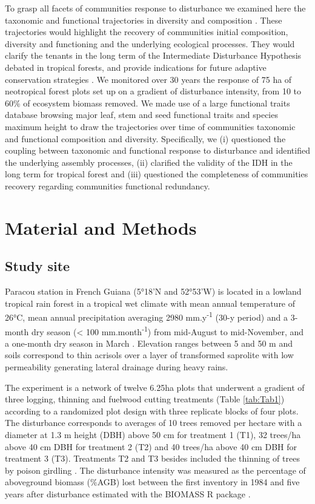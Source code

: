 \documentclass[fleqn,10pt]{ArtEcoFoG} %
\theoremstyle{definition}
\theoremstyle{definition}
\theoremstyle{definition}
\theoremstyle{remark}
\begin{document}
To grasp all facets of communities response to disturbance we examined
here the taxonomic and functional trajectories in diversity and
composition \citep{Lohbeck2015, Guariguata2001}. These trajectories
would highlight the recovery of communities initial composition,
diversity and functioning and the underlying ecological processes. They
would clarify the tenants in the long term of the Intermediate
Disturbance Hypothesis debated in tropical forests, and provide
indications for future adaptive conservation strategies
\citep{Adler2007}. We monitored over 30 years the response of 75 ha of
neotropical forest plots set up on a gradient of disturbance intensity,
from 10 to 60\% of ecosystem biomass removed. We made use of a large
functional traits database browsing major leaf, stem and seed functional
traits and species maximum height to draw the trajectories over time of
communities taxonomic and functional composition and diversity.
Specifically, we (i) questioned the coupling between taxonomic and
functional response to disturbance and identified the underlying
assembly processes, (ii) clarified the validity of the IDH in the long
term for tropical forest and (iii) questioned the completeness of
communities recovery regarding communities functional redundancy.

\section{Material and Methods}\label{material-and-methods}

\subsection{Study site}\label{study-site}

Paracou station in French Guiana (5°18'N and 52°53'W) is located in a
lowland tropical rain forest in a tropical wet climate with mean annual
temperature of 26°C, mean annual precipitation averaging 2980
mm.y\textsuperscript{-1} (30-y period) and a 3-month dry season
(\textless{} 100 mm.month\textsuperscript{-1}) from mid-August to
mid-November, and a one-month dry season in March \citep{Wagner2011}.
Elevation ranges between 5 and 50 m and soils correspond to thin
acrisols over a layer of transformed saprolite with low permeability
generating lateral drainage during heavy rains.

The experiment is a network of twelve 6.25ha plots that underwent a
gradient of three logging, thinning and fuelwood cutting treatments
(Table \ref{tab:Tab1}) according to a randomized plot design with three
replicate blocks of four plots. The disturbance corresponds to averages
of 10 trees removed per hectare with a diameter at 1.3 m height (DBH)
above 50 cm for treatment 1 (T1), 32 trees/ha above 40 cm DBH for
treatment 2 (T2) and 40 trees/ha above 40 cm DBH for treatment 3 (T3).
Treatments T2 and T3 besides included the thinning of trees by poison
girdling \citep{Schmitt1990, Blanc2009}. The disturbance intensity was
measured as the percentage of aboveground biomass (\%AGB) lost between
the first inventory in 1984 and five years after disturbance
\citep{Piponiot2016} estimated with the BIOMASS R package
\citep{Biomass2018}.
\end{document}
